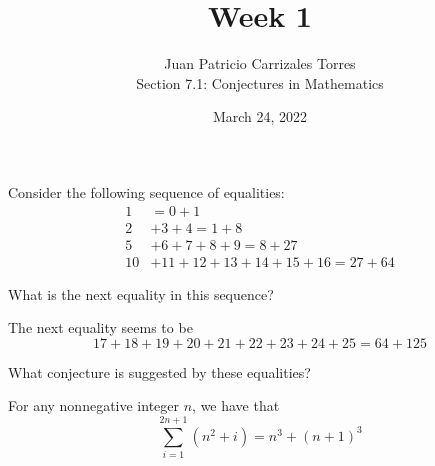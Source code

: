 \documentclass[12pt]{article}
\newenvironment{problem}[2][Problem]{\begin{trivlist}
		\item[\hskip \labelsep {\bfseries #1}\hskip \labelsep {\bfseries #2.}]}{\end{trivlist}}
\newenvironment{solution}[2][Solution]{\begin{trivlist}
		\item[\hskip \labelsep {\bfseries #1}\hskip \labelsep {\bfseries #2.}]}{\end{trivlist}}
\begin{document}
	
	\title{Week 1}
	\author{Juan Patricio Carrizales Torres \\
		Section 7.1: Conjectures in Mathematics}
	\date{March 24, 2022}
	\maketitle
	
	\begin{problem}{1}
		Consider the following sequence of equalities:
		\begin{align*}
			1&=0+1\\
			2&+3+4=1+8\\
			5&+6+7+8+9=8+27\\
			10&+11+12+13+14+15+16=27+64
		\end{align*}
	\begin{enumerate}[label=(\alph*)]
		\item What is the next equality in this sequence?
		\begin{solution}{(a)}
		The next equality seems to be
		\begin{equation*}
			17+18+19+20+21+22+23+24+25 = 64+125
		\end{equation*}
		\end{solution}
	
		\item What conjecture is suggested by these equalities?
		\begin{solution}{(b)}
			For any nonnegative integer $n$, we have that 
			\begin{equation*}
			\sum_{i=1}^{2n+1}(n^{2}+i) = n^{3} + (n+1)^{3}
			\end{equation*}
		\end{solution}
		

\end{enumerate}
\end{problem}
\end{document}
